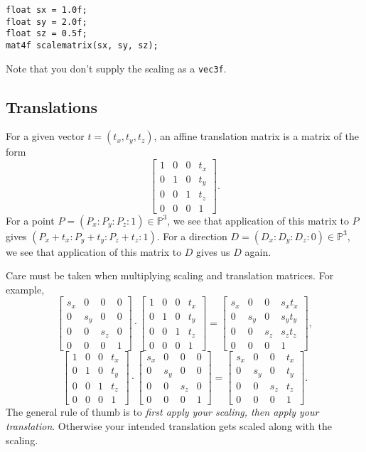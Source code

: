 \documentclass{article}
\begin{document}
\begin{lstlisting}
float sx = 1.0f;
float sy = 2.0f;
float sz = 0.5f;
mat4f scalematrix(sx, sy, sz);
\end{lstlisting}
Note that you don't supply the scaling as a \texttt{vec3f}.

\subsection{Translations}

For a given vector $t = (t_x, t_y, t_z)$, an affine translation matrix is a matrix of the form
\[ \begin{bmatrix} 1 & 0 & 0 & t_x \\ 0 & 1 & 0 & t_y \\ 0 & 0 & 1 & t_z \\ 0 & 0 & 0 & 1 \end{bmatrix}. \]
For a point $P = (P_x : P_y : P_z : 1) \in \mathbb{P}^3$, we see that application of this matrix to $P$ gives $(P_x + t_x : P_y + t_y : P_z + t_z : 1)$. For a direction $D = (D_x : D_y : D_z : 0) \in \mathbb{P}^3$, we see that application of this matrix to $D$ gives us $D$ again.

Care must be taken when multiplying scaling and translation matrices. For example,
\[ \begin{bmatrix} s_x & 0 & 0 & 0 \\ 0 & s_y & 0 & 0 \\ 0 & 0 & s_z & 0 \\ 0 & 0 & 0 & 1 \end{bmatrix} \cdot \begin{bmatrix} 1 & 0 & 0 & t_x \\ 0 & 1 & 0 & t_y \\ 0 & 0 & 1 & t_z \\ 0 & 0 & 0 & 1 \end{bmatrix} = \begin{bmatrix} s_x & 0 & 0 & s_xt_x \\ 0 & s_y & 0 & s_yt_y \\ 0 & 0 & s_z & s_zt_z \\ 0 & 0 & 0 & 1 \end{bmatrix}, \]
\[ \begin{bmatrix} 1 & 0 & 0 & t_x \\ 0 & 1 & 0 & t_y \\ 0 & 0 & 1 & t_z \\ 0 & 0 & 0 & 1 \end{bmatrix} \cdot \begin{bmatrix} s_x & 0 & 0 & 0 \\ 0 & s_y & 0 & 0 \\ 0 & 0 & s_z & 0 \\ 0 & 0 & 0 & 1 \end{bmatrix} = \begin{bmatrix} s_x & 0 & 0 & t_x \\ 0 & s_y & 0 & t_y \\ 0 & 0 & s_z & t_z \\ 0 & 0 & 0 & 1 \end{bmatrix}. \]
The general rule of thumb is to \emph{first apply your scaling, then apply your translation}. Otherwise your intended translation gets scaled along with the scaling.
\end{document}
